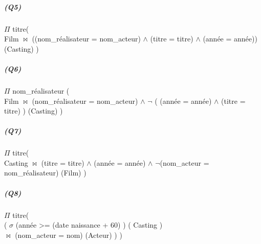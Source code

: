 \documentclass[12pt]
{report}
\newcommand\tab[1][1cm]{\hspace*{#1}}
\begin{document}
\subparagraph*{\textbf{(Q5)}}
\begin{center}
$\Pi$ {\scriptsize titre}(\tab\tab\tab\tab\tab\tab\tab\tab\tab\tab\tab\tab\tab
\\Film $\bowtie$ {\scriptsize ((nom\_réalisateur = nom\_acteur) $\wedge$ (titre = titre) $\wedge$ (année = année))} (Casting) )
\end{center}

\subparagraph*{\textbf{(Q6)}}
\begin{center}
$\Pi$ {\scriptsize nom\_réalisateur} ( \tab\tab\tab\tab\tab\tab\tab\tab\tab\tab\tab
\\ Film $\bowtie$ {\scriptsize (nom\_réalisateur = nom\_acteur) $\wedge$ $\neg$ ( (année = année) $\wedge$ (titre = titre) )} (Casting) )
\end{center}

\subparagraph*{\textbf{(Q7)}} 
\begin{center}
$\Pi$ {\scriptsize titre}( \tab\tab\tab\tab\tab\tab\tab\tab\tab\tab\tab\tab\tab
\\Casting $\bowtie$ {\scriptsize (titre = titre) $\wedge$ (année = année) $\wedge$ $\neg$(nom\_acteur = nom\_réalisateur)} (Film) )
\end{center}

\subparagraph*{\textbf{(Q8)}}
\begin{center}
$\Pi$ {\scriptsize titre}(\tab\tab\tab\tab\tab\tab\tab\tab\tab\tab\tab\tab\tab
\\ ( $\sigma$ {\scriptsize (année >= (date naissance + 60) )}  ( Casting )  \tab\tab\tab\tab\tab\tab
\\  $\bowtie$ {\scriptsize (nom\_acteur = nom) } (Acteur) ) )
\end{center}
	
\end{document}
